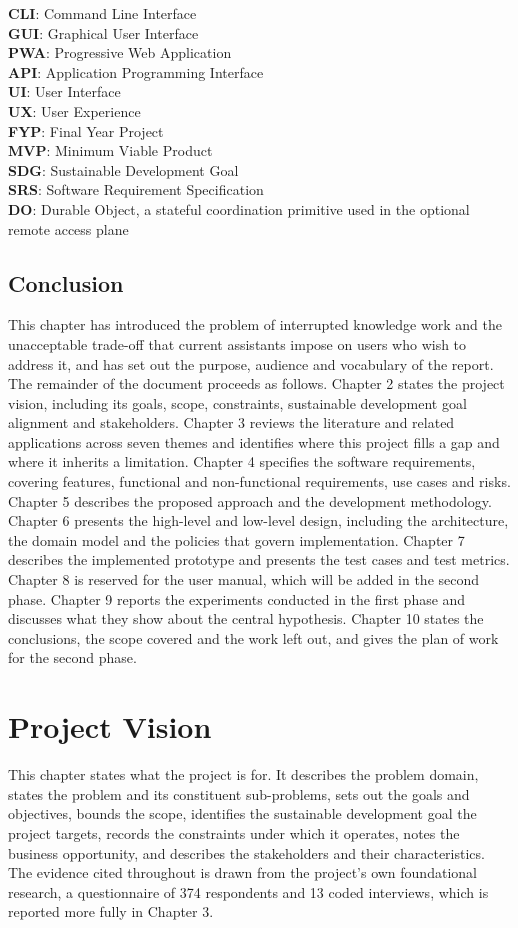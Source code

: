\documentclass{FastFyp}
\begin{document}
\textbf{CLI}: Command Line Interface\\
\textbf{GUI}: Graphical User Interface\\
\textbf{PWA}: Progressive Web Application\\
\textbf{API}: Application Programming Interface\\
\textbf{UI}: User Interface\\
\textbf{UX}: User Experience\\
\textbf{FYP}: Final Year Project\\
\textbf{MVP}: Minimum Viable Product\\
\textbf{SDG}: Sustainable Development Goal\\
\textbf{SRS}: Software Requirement Specification\\
\textbf{DO}: Durable Object, a stateful coordination primitive used in the optional remote access plane

\section{Conclusion}
This chapter has introduced the problem of interrupted knowledge work and the unacceptable trade-off that current assistants impose on users who wish to address it, and has set out the purpose, audience and vocabulary of the report. The remainder of the document proceeds as follows. Chapter 2 states the project vision, including its goals, scope, constraints, sustainable development goal alignment and stakeholders. Chapter 3 reviews the literature and related applications across seven themes and identifies where this project fills a gap and where it inherits a limitation. Chapter 4 specifies the software requirements, covering features, functional and non-functional requirements, use cases and risks. Chapter 5 describes the proposed approach and the development methodology. Chapter 6 presents the high-level and low-level design, including the architecture, the domain model and the policies that govern implementation. Chapter 7 describes the implemented prototype and presents the test cases and test metrics. Chapter 8 is reserved for the user manual, which will be added in the second phase. Chapter 9 reports the experiments conducted in the first phase and discusses what they show about the central hypothesis. Chapter 10 states the conclusions, the scope covered and the work left out, and gives the plan of work for the second phase.


\chapter{Project Vision}
This chapter states what the project is for. It describes the problem domain, states the problem and its constituent sub-problems, sets out the goals and objectives, bounds the scope, identifies the sustainable development goal the project targets, records the constraints under which it operates, notes the business opportunity, and describes the stakeholders and their characteristics. The evidence cited throughout is drawn from the project's own foundational research, a questionnaire of 374 respondents and 13 coded interviews, which is reported more fully in Chapter 3.
\end{document}
